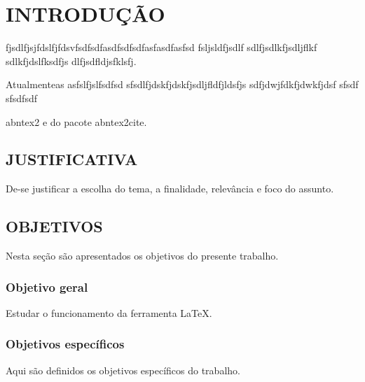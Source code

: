 \documentclass[
	12pt,				%
	openright,			%
	oneside,			%
	a4paper,			%
	chapter=TITLE,		%
	section=TITLE,		%
	english,			%
	french,				%
	spanish,			%
	brazil				%
	]{abntex2}
\begin{document}
\tableofcontents*
\clearpage

\textual



\chapter{INTRODUÇÃO}

fjsdlfjsjfdslfjfdsvfsdfsdfasdfsdfsdfasfasdfasfsd fsljsldfjsdlf sdlfjsdlkfjsdljflkf sdlkfjdslfksdfjs dlfjsdfldjsfklsfj.

Atualmenteas asfslfjslfsdfsd
sfsdlfjdskfjdskfjsdljfldfjldsfjs
sdfjdwjfdkfjdwkfjdsf
sfsdf sfsdfsdf

\textsf{abntex2} e do pacote \textsf{abntex2cite}.

\section{JUSTIFICATIVA}

De-se justificar a escolha do tema, a finalidade, relevância e foco do assunto.

\section{OBJETIVOS}

Nesta seção são apresentados os objetivos do presente trabalho.

\subsection{Objetivo geral}

Estudar o funcionamento da ferramenta \LaTeX.

\subsection{Objetivos específicos}

Aqui são definidos os objetivos específicos do trabalho.
\end{document}
